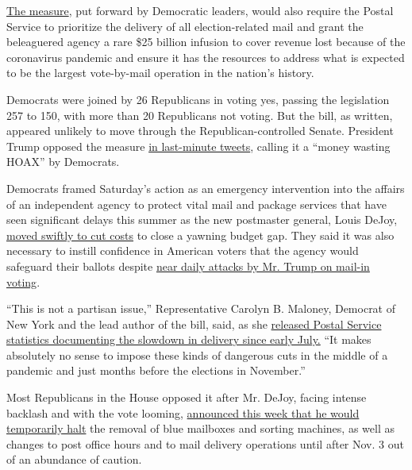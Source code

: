\href{https://rules.house.gov/sites/democrats.rules.house.gov/files/BILLS-116HR8015-RCP116-61.pdf}{The
measure}, put forward by Democratic leaders, would also require the
Postal Service to prioritize the delivery of all election-related mail
and grant the beleaguered agency a rare \$25 billion infusion to cover
revenue lost because of the coronavirus pandemic and ensure it has the
resources to address what is expected to be the largest vote-by-mail
operation in the nation's history.

Democrats were joined by 26 Republicans in voting yes, passing the
legislation 257 to 150, with more than 20 Republicans not voting. But
the bill, as written, appeared unlikely to move through the
Republican-controlled Senate. President Trump opposed the measure
\href{https://twitter.com/realDonaldTrump/status/1297275235432005632}{in
last-minute tweets}, calling it a ``money wasting HOAX'' by Democrats.

Democrats framed Saturday's action as an emergency intervention into the
affairs of an independent agency to protect vital mail and package
services that have seen significant delays this summer as the new
postmaster general, Louis DeJoy,
\href{https://www.nytimes3xbfgragh.onion/2020/08/15/us/post-office-vote-by-mail.html}{moved
swiftly to cut costs} to close a yawning budget gap. They said it was
also necessary to instill confidence in American voters that the agency
would safeguard their ballots despite
\href{https://www.nytimes3xbfgragh.onion/2020/08/03/us/politics/trump-mail-in-voting.html}{near
daily attacks by Mr. Trump on mail-in voting}.

``This is not a partisan issue,'' Representative Carolyn B. Maloney,
Democrat of New York and the lead author of the bill, said, as she
\href{https://oversight.house.gov/sites/democrats.oversight.house.gov/files/PMG\%20Briefing\%20\%E2\%80\%93\%20Service\%20Performance\%20Management\%2008-12-20.pdf}{released
Postal Service statistics documenting the slowdown in delivery since
early July.} ``It makes absolutely no sense to impose these kinds of
dangerous cuts in the middle of a pandemic and just months before the
elections in November.''

Most Republicans in the House opposed it after Mr. DeJoy, facing intense
backlash and with the vote looming,
\href{https://www.nytimes3xbfgragh.onion/2020/08/18/us/politics/postal-service-suspends-changes.html}{announced
this week that he would temporarily halt} the removal of blue mailboxes
and sorting machines, as well as changes to post office hours and to
mail delivery operations until after Nov. 3 out of an abundance of
caution.


